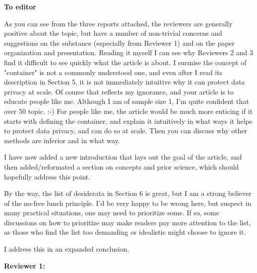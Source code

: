 \textbf{To editor} 

\begin{referee}
As you can see from the three reports attached,
the reviewers are generally positive about the topic, but have a number of non-trivial concerns and
suggestions on the substance (especially from Reviewer 1) and on the paper organization and
presentation. Reading it myself I can see why Reviewers 2 and 3 find it difficult to see quickly what the
article is about. I surmise the concept of "container" is not a commonly understood one, and even
after I read its description in Section 5, it is not immediately intuitive why it can protect data privacy at
scale. Of course that reflects my ignorance, and your article is to educate people like me. Although I
am of sample size 1, I'm quite confident that over 50%
topic. :-)
For people like me, the article would be much more enticing if it starts with defining the container,
and explain it intuitively in what ways it helps to protect data privacy, and can do so at scale. Then
you can discuss why other methods are inferior and in what way. 
\end{referee}

\begin{response}
    I have now added a new introduction that lays out the goal of the article, and then added/reformated a section on concepts and prior science, which should hopefully address this point.
\end{response}

\begin{referee}
By the way, the list of desiderata in
Section 6 is great,
but I am a strong believer of the no-free lunch principle. I'd be very happy to be wrong here, but
suspect in many practical situations, one may need to prioritize some. If so, some discussions on how
to prioritize may make readers pay more attention to the list, as those who find the list too
demanding or idealistic might choose to ignore it.

\end{referee}

\begin{response}
    I address this in an expanded conclusion.
\end{response}


\textbf{Reviewer 1:}

